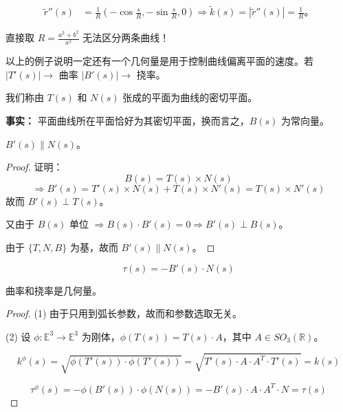 \documentclass[lang=cn,10pt,thmcnt=section]{elegantbook}
\begin{document}
    \begin{align*}
    \tilde{r}''(s) &= \frac{1}{R} \left( -\cos \frac{s}{R}, -\sin \frac{s}{R}, 0 \right) \Rightarrow \tilde{k}(s) = |\tilde{r}''(s)| = \frac{1}{R}。
    \end{align*}
    
$\text{直接取 } R = \frac{a^2 + b^2}{a^2} \text{ 无法区分两条曲线！}$

    以上的例子说明一定还有一个几何量是用于控制曲线偏离平面的速度。若 $|T'(s)| \rightarrow$ 曲率 $|B'(s)| \rightarrow$ 挠率。

    \begin{definition}[密切平面]
    我们称由 $T(s)$ 和 $N(s)$ 张成的平面为曲线的密切平面。
    \end{definition}
    
    \textbf{事实：} 平面曲线所在平面恰好为其密切平面，换而言之，$B(s)$ 为常向量。
\begin{proposition}
        \label{prop:B'N}
        $B'(s) \parallel N(s)$。
\end{proposition}
        
        \begin{proof}
        证明：
        \[
        B(s) = T(s) \times N(s)
        \]
        \[
        \Rightarrow B'(s) = T'(s) \times N(s) + T(s) \times N'(s) = T(s) \times N'(s)
        \]
        故而 $B'(s) \perp T(s)$。
        
        又由于 $B(s)$ 单位 $\Rightarrow B(s) \cdot B'(s) = 0 \Rightarrow B'(s) \perp B(s)$。
        
        由于 $\{T, N, B\}$ 为基，故而 $B'(s) \parallel N(s)$。
\end{proof}
\begin{definition}[挠率]
    \[
    \tau(s) = -B'(s) \cdot N(s)
    \]
\end{definition}
\begin{proposition}
    曲率和挠率是几何量。
    \end{proposition}
    
    \begin{proof}
    (1) 由于只用到弧长参数，故而和参数选取无关。
    
    (2) 设 $\phi: \mathbb{E}^3 \rightarrow \mathbb{E}^3$ 为刚体，$\phi(T(s)) = T(s) \cdot A$，其中 $A \in SO_3(\mathbb{R})$。
    
    \[
    k^\phi(s) = \sqrt{\phi(T'(s)) \cdot \phi(T'(s))} = \sqrt{T'(s) \cdot A \cdot A^T \cdot T'(s)} = k(s)
    \]
    
    \[
    \tau^\phi(s) = -\phi(B'(s)) \cdot \phi(N(s)) = -B'(s) \cdot A \cdot A^T \cdot N = \tau(s)
    \]
\end{proof}
\end{document}
